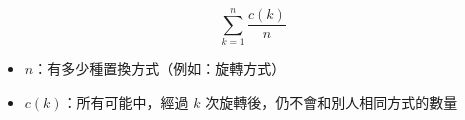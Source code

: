 $$
\sum\limits_{k=1}^{n} \frac{c(k)}{n}
$$

\begin{itemize}
    \item $n$：有多少種置換方式（例如：旋轉方式）
    \item $c(k)$：所有可能中，經過 $k$ 次旋轉後，仍不會和別人相同方式的數量
\end{itemize}